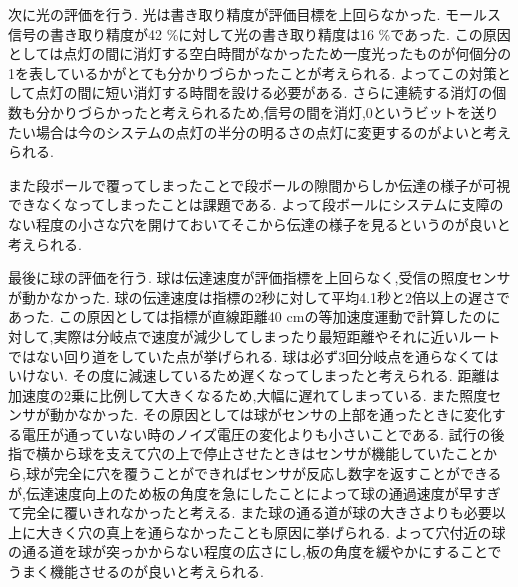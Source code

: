 次に光の評価を行う.
光は書き取り精度が評価目標を上回らなかった.
モールス信号の書き取り精度が42 \%に対して光の書き取り精度は16 \%であった.
この原因としては点灯の間に消灯する空白時間がなかったため一度光ったものが何個分の1を表しているかがとても分かりづらかったことが考えられる.
よってこの対策として点灯の間に短い消灯する時間を設ける必要がある.
さらに連続する消灯の個数も分かりづらかったと考えられるため,信号の間を消灯,0というビットを送りたい場合は今のシステムの点灯の半分の明るさの点灯に変更するのがよいと考えられる.

また段ボールで覆ってしまったことで段ボールの隙間からしか伝達の様子が可視できなくなってしまったことは課題である.
よって段ボールにシステムに支障のない程度の小さな穴を開けておいてそこから伝達の様子を見るというのが良いと考えられる.


最後に球の評価を行う.
球は伝達速度が評価指標を上回らなく,受信の照度センサが動かなかった.
球の伝達速度は指標の2秒に対して平均4.1秒と2倍以上の遅さであった.
この原因としては指標が直線距離40 cmの等加速度運動で計算したのに対して,実際は分岐点で速度が減少してしまったり最短距離やそれに近いルートではない回り道をしていた点が挙げられる.
球は必ず3回分岐点を通らなくてはいけない.
その度に減速しているため遅くなってしまったと考えられる.
距離は加速度の2乗に比例して大きくなるため,大幅に遅れてしまっている.
また照度センサが動かなかった.
その原因としては球がセンサの上部を通ったときに変化する電圧が通っていない時のノイズ電圧の変化よりも小さいことである.
試行の後指で横から球を支えて穴の上で停止させたときはセンサが機能していたことから,球が完全に穴を覆うことができればセンサが反応し数字を返すことができるが,伝達速度向上のため板の角度を急にしたことによって球の通過速度が早すぎて完全に覆いきれなかったと考える.
また球の通る道が球の大きさよりも必要以上に大きく穴の真上を通らなかったことも原因に挙げられる.
よって穴付近の球の通る道を球が突っかからない程度の広さにし,板の角度を緩やかにすることでうまく機能させるのが良いと考えられる.